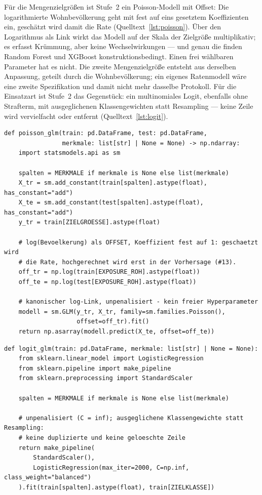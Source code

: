 Für die Mengenzielgrößen ist Stufe~2 ein Poisson-Modell mit Offset: Die
logarithmierte Wohnbevölkerung geht mit fest auf eins gesetztem Koeffizienten
ein, geschätzt wird damit die Rate (Quelltext~\ref{lst:poisson}). Über den
Logarithmus als Link wirkt das Modell auf der Skala der Zielgröße
multiplikativ; es erfasst Krümmung, aber keine Wechselwirkungen --- und genau
die finden Random Forest und XGBoost konstruktionsbedingt. Einen frei wählbaren
Parameter hat es nicht. Die zweite Mengenzielgröße entsteht aus derselben
Anpassung, geteilt durch die Wohnbevölkerung; ein eigenes Ratenmodell wäre eine
zweite Spezifikation und damit nicht mehr dasselbe Protokoll. Für die
Einsatzart ist Stufe~2 das Gegenstück: ein multinomiales Logit, ebenfalls ohne
Strafterm, mit ausgeglichenen Klassengewichten statt Resampling --- keine Zeile
wird vervielfacht oder entfernt (Quelltext~\ref{lst:logit}).

\begin{lstlisting}[style=pythonstil,
  label={lst:poisson},
  caption={Poisson-Modell mit Offset, Stufe 2 der Menge
           (\texttt{vorpruefung/v1\_baselines.py}, Z.~74--108, gekürzt)}]
def poisson_glm(train: pd.DataFrame, test: pd.DataFrame,
                merkmale: list[str] | None = None) -> np.ndarray:
    import statsmodels.api as sm

    spalten = MERKMALE if merkmale is None else list(merkmale)
    X_tr = sm.add_constant(train[spalten].astype(float), has_constant="add")
    X_te = sm.add_constant(test[spalten].astype(float),  has_constant="add")
    y_tr = train[ZIELGROESSE].astype(float)

    # log(Bevoelkerung) als OFFSET, Koeffizient fest auf 1: geschaetzt wird
    # die Rate, hochgerechnet wird erst in der Vorhersage (#13).
    off_tr = np.log(train[EXPOSURE_ROH].astype(float))
    off_te = np.log(test[EXPOSURE_ROH].astype(float))

    # kanonischer log-Link, unpenalisiert - kein freier Hyperparameter
    modell = sm.GLM(y_tr, X_tr, family=sm.families.Poisson(),
                    offset=off_tr).fit()
    return np.asarray(modell.predict(X_te, offset=off_te))
\end{lstlisting}

\begin{lstlisting}[style=pythonstil,
  label={lst:logit},
  caption={Multinomiales Logit, Stufe 2 der Struktur
           (\texttt{vorpruefung/v1\_baselines.py}, Z.~111--139, gekürzt)}]
def logit_glm(train: pd.DataFrame, merkmale: list[str] | None = None):
    from sklearn.linear_model import LogisticRegression
    from sklearn.pipeline import make_pipeline
    from sklearn.preprocessing import StandardScaler

    spalten = MERKMALE if merkmale is None else list(merkmale)

    # unpenalisiert (C = inf); ausgeglichene Klassengewichte statt Resampling:
    # keine duplizierte und keine geloeschte Zeile
    return make_pipeline(
        StandardScaler(),
        LogisticRegression(max_iter=2000, C=np.inf, class_weight="balanced")
    ).fit(train[spalten].astype(float), train[ZIELKLASSE])
\end{lstlisting}

